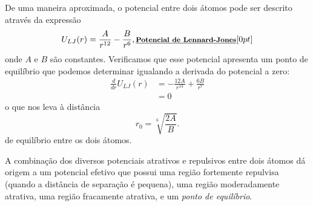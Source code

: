 De uma maneira aproximada, o potencial entre dois átomos pode ser descrito através da expressão
\begin{equation}
    U_{LJ}(r) = \frac{A}{r^{12}} - \frac{B}{r^{6}}, \relax{\footnotesize\emph{\textbf{Potencial de Lennard-Jones}}}[0pt]
\end{equation}
%
onde $A$ e $B$ são constantes. Verificamos que esse potencial apresenta um ponto de equilíbrio que podemos determinar igualando a derivada do potencial a zero:
\begin{align}
    \frac{d}{dr}U_{LJ}(r) &= -\frac{12A}{r^{13}} + \frac{6B}{r^7} \\
    &= 0
\end{align}
%
o que nos leva à distância
\begin{equation}
    r_0 = \sqrt[6]{\frac{2A}{B}}.
\end{equation}
%
de equilíbrio entre os dois átomos.

\begin{marginfigure}[-3.5cm]
\centering
{}
\caption{A combinação dos diversos potenciais atrativos e repulsivos entre dois átomos dá origem a um potencial efetivo que possui uma região fortemente repulvisa (quando a distância de separação é pequena), uma região moderadamente atrativa, uma região fracamente atrativa, e um \emph{ponto de equilíbrio}. \label{Fig:PotLennardJones}}
\end{marginfigure}


